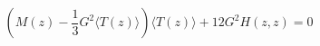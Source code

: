 \begin{equation}
(M(z)-\frac{1}{3}G^2\langle T(z)\rangle)\langle T(z)\rangle +12 G^2 H(z,z) =0
\end{equation}

